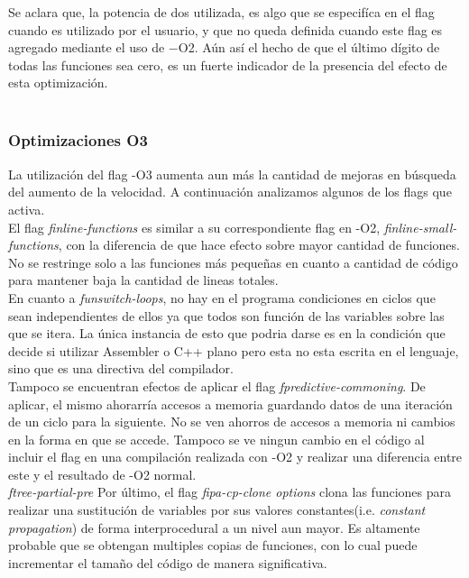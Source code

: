 Se aclara que, la potencia de dos utilizada, es algo que se especifíca en el flag cuando es utilizado por el usuario, y que no queda definida cuando este flag es agregado mediante el uso de $-$O2. Aún así el hecho de que el último dígito de todas las funciones sea cero, es un fuerte indicador de la presencia del efecto de esta optimización.\\


~\\


\subsubsection{Optimizaciones O3}

La utilización del flag -O3 aumenta aun más la cantidad de mejoras en búsqueda del aumento de la velocidad. A continuación analizamos algunos de los flags que activa.
~\\

El flag \textit{finline-functions} es similar a su correspondiente flag en -O2, \textit{finline-small-functions}, con la diferencia de que hace efecto sobre mayor cantidad de funciones. No se restringe solo a las funciones más pequeñas en cuanto a cantidad de código para mantener baja la cantidad de lineas totales.\\

En cuanto a \textit{funswitch-loops}, no hay en el programa condiciones en ciclos que sean independientes de ellos ya que todos son función de las variables sobre las que se itera. La única instancia de esto que podria darse es en la condición que decide si utilizar Assembler o C++ plano pero esta no esta escrita en el lenguaje, sino que es una directiva del compilador.\\

Tampoco se encuentran efectos de aplicar el flag \textit{fpredictive-commoning}. De aplicar, el mismo ahorarría accesos a memoria guardando datos de una iteración de un ciclo para la siguiente. No se ven ahorros de accesos a memoria ni cambios en la forma en que se accede. Tampoco se ve ningun cambio en el código al incluir el flag en una compilación realizada con -O2 y realizar una diferencia entre este y el resultado de -O2 normal.\\


\textit{ftree-partial-pre}
Por último, el flag \textit{fipa-cp-clone options} clona las funciones para realizar una sustitución de variables por sus valores constantes(i.e. \textit{constant propagation}) de forma interprocedural a un nivel aun mayor. Es altamente probable que se obtengan multiples copias de funciones, con lo cual puede incrementar el tamaño del código de manera significativa. \\

